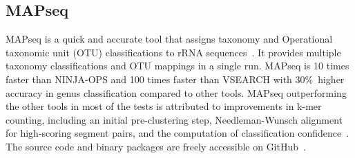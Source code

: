\subsection{MAPseq}\label{subsec:MAPseq}
MAPseq is a quick and accurate tool that assigns taxonomy and Operational taxonomic unit (OTU) classifications to rRNA sequences~\cite{rodrigues_mapseq_2023}. It provides multiple taxonomy classifications and OTU mappings in a single run. MAPseq is 10 times faster than NINJA-OPS and 100 times faster than VSEARCH with 30\%\ higher accuracy in genus classification compared to other tools. MAPseq outperforming the other tools in most of the tests is attributed to improvements in k-mer counting, including an initial pre-clustering step, Needleman-Wunsch alignment for high-scoring segment pairs, and the computation of classification confidence~\cite{matias_rodrigues_mapseq_2017}. The source code and binary packages are freely accessible on GitHub~\cite{rodrigues_mapseq_2023}.

